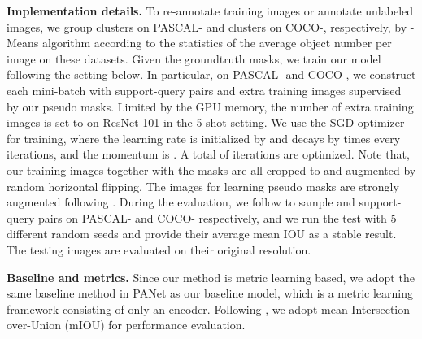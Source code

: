 \documentclass[10pt,twocolumn,letterpaper]{article}
\begin{document}
\textbf{Implementation details.}
To re-annotate training images or annotate unlabeled images, we group  clusters on PASCAL- and  clusters on COCO-, respectively, by -Means algorithm according to the statistics of the average object number per image on these datasets. Given the groundtruth masks, we train our model following the setting below. In particular, on PASCAL- and COCO-, we construct each mini-batch with  support-query pairs and  extra training images supervised by our pseudo masks. Limited by the GPU memory, the number of extra training images is set to  on ResNet-101 in the 5-shot setting. We use the SGD optimizer for training, where the learning rate is initialized by  and decays by  times every  iterations, and the momentum is . A total of  iterations are optimized. Note that, our training images together with the masks are all cropped to  and augmented by random horizontal flipping. The images for learning pseudo masks are strongly augmented following \cite{chen2020simple}. During the evaluation, we follow \cite{tian2020prior} to sample  and  support-query pairs on PASCAL- and COCO- respectively, and we run the test with 5 different random seeds and provide their average mean IOU as a stable result. The testing images are evaluated on their original resolution. 

\textbf{Baseline and metrics.}
Since our method is metric learning based, we adopt the same baseline method in PANet \cite{wang2019panet} as our baseline model, which is a metric learning framework consisting of only an encoder. Following \cite{shaban2017one, wang2019panet, liu2020part, liu2020crnet},  we adopt mean Intersection-over-Union (mIOU) for performance evaluation.
\end{document}
